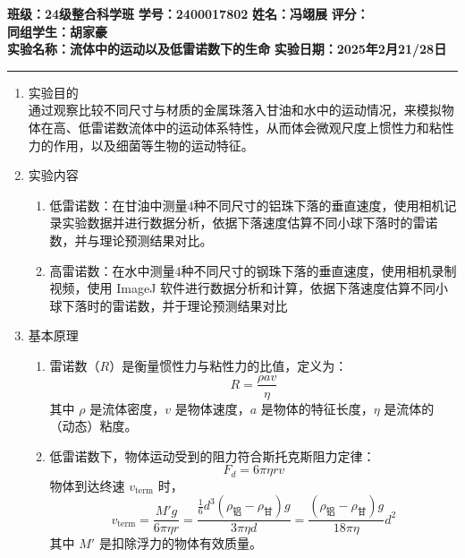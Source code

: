 \documentclass[a4paper]{article}
\begin{document}
\noindent\textbf{班级：24级整合科学班} \hspace{1cm} \textbf{学号：2400017802} \hspace{1cm} \textbf{姓名：冯翊展} \hspace{1cm} \textbf{评分：}\\
\textbf{同组学生：胡家豪} \\
\textbf{实验名称：流体中的运动以及低雷诺数下的生命}   \hfill \textbf{实验日期：2025年2月21/28日} 

\hrule
\vspace{3mm}

\begin{enumerate}[label=\chinese*.,left=0pt]
    \item 实验目的
    \\[3mm]
    通过观察比较不同尺寸与材质的金属珠落入甘油和水中的运动情况，来模拟物体在高、低雷诺数流体中的运动体系特性，从而体会微观尺度上惯性力和粘性力的作用，以及细菌等生物的运动特征。
    
    \item 实验内容
    \begin{enumerate}[label=\arabic*.,left = 0pt]
        \item 低雷诺数：在甘油中测量4种不同尺寸的铝珠下落的垂直速度，使用相机记录实验数据并进行数据分析，依据下落速度估算不同小球下落时的雷诺数，并与理论预测结果对比。
        \item 高雷诺数：在水中测量4种不同尺寸的钢珠下落的垂直速度，使用相机录制视频，使用 ImageJ 软件进行数据分析和计算，依据下落速度估算不同小球下落时的雷诺数，并于理论预测结果对比
    \end{enumerate}
    
    \item 基本原理
    \begin{enumerate}[label=\arabic*.,left = 0pt]
        \item 雷诺数（$R$）是衡量惯性力与粘性力的比值，定义为：
        \begin{equation}
            \label{tab:Reynold}
            R=\frac{\rho a v}{\eta}
        \end{equation}
        其中 $\rho$ 是流体密度，$v$ 是物体速度，$a$ 是物体的特征长度，$\eta$ 是流体的（动态）粘度。

        \item 低雷诺数下，物体运动受到的阻力符合斯托克斯阻力定律：
        \begin{equation}
            \label{tab:Stokes}
            F_d=6 \pi \eta r v
        \end{equation}
        物体到达终速 $v_{\text{term}}$ 时，
        \begin{equation}
            \label{tab:vterm1}
            v_{\text{term}} = \frac{M'g}{6\pi \eta r} =\frac{\frac{1}{6}d^3(\rho_{\text{铝}}-\rho_{\text{甘}})g}{3\pi\eta d} = \frac{(\rho_{\text{铝}}-\rho_{\text{甘}})g}{18\pi\eta }d^2
        \end{equation}
        其中 $M'$ 是扣除浮力的物体有效质量。


\end{enumerate}
\end{enumerate}
\end{document}
